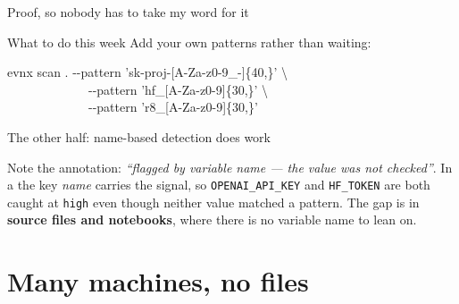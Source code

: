 \documentclass[aspectratio=169,10pt]{beamer}
\begin{document}
\begin{frame}[fragile]{Proof, so nobody has to take my word for it}

  \vspace{0.4em}
  \begin{block}{What to do this week}
    Add your own patterns rather than waiting:
    \vspace{0.3em}
    \begin{center}\ttfamily\scriptsize
    evnx scan . -{}-pattern 'sk-proj-[A-Za-z0-9\_-]\{40,\}' \textbackslash \\
    \ \ \ \ \ \ \ \ \ \ \ \ \ -{}-pattern 'hf\_[A-Za-z0-9]\{30,\}' \textbackslash \\
    \ \ \ \ \ \ \ \ \ \ \ \ \ -{}-pattern 'r8\_[A-Za-z0-9]\{30,\}'
    \end{center}
  \end{block}
\end{frame}

\begin{frame}[fragile]{The other half: name-based detection does work}

  \vspace{0.3em}
  {\footnotesize Note the annotation: \emph{``flagged by variable name --- the
  value was not checked''}. In a  the key \emph{name} carries the
  signal, so \texttt{OPENAI\_API\_KEY} and \texttt{HF\_TOKEN} are both caught
  at \texttt{high} even though neither value matched a pattern. The gap is in
  \textbf{source files and notebooks}, where there is no variable name to lean on.}
\end{frame}

\section{Many machines, no files}
\end{document}
